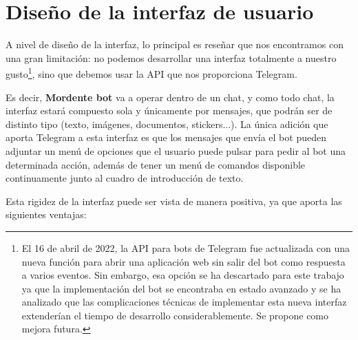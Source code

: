 \chapter{Diseño de la interfaz de usuario}\label{chapter:diu}

A nivel de diseño de la interfaz, lo principal es reseñar que nos encontramos con una gran limitación: no podemos desarrollar una interfaz totalmente a nuestro gusto\footnote{El 16 de abril de 2022, la API para bots de Telegram fue actualizada\cite{telegramWebappUpdate} con una nueva función para abrir una aplicación web sin salir del bot como respuesta a varios eventos. Sin embargo, esa opción se ha descartado para este trabajo ya que la implementación del bot se encontraba en estado avanzado y se ha analizado que las complicaciones técnicas de implementar esta nueva interfaz extenderían el tiempo de desarrollo considerablemente. Se propone como mejora futura.}, sino que debemos usar la API que nos proporciona Telegram.

Es decir, \textbf{Mordente bot} va a operar dentro de un chat, y como todo chat, la interfaz estará compuesto sola y únicamente por mensajes, que podrán ser de distinto tipo (texto, imágenes, documentos, stickers...). La única adición que aporta Telegram a esta interfaz es que los mensajes que envía el bot pueden adjuntar un menú de opciones que el usuario puede pulsar para pedir al bot una determinada acción, además de tener un menú de comandos disponible continuamente junto al cuadro de introducción de texto.

Esta rigidez de la interfaz puede ser vista de manera positiva, ya que aporta las siguientes ventajas:

